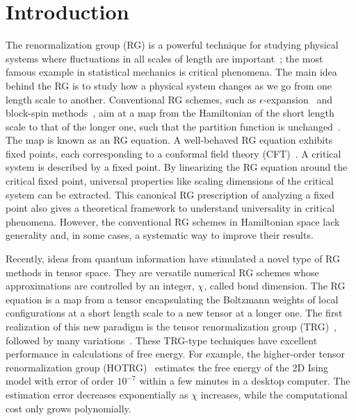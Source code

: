\documentclass[aps,prr,reprint,superscriptaddress,floatfix]{revtex4-2}
\begin{document}
\maketitle

\section{Introduction\label{intro}}
The renormalization group (RG) is a powerful technique for studying physical systems where fluctuations in all scales of length are important~\cite{wilsonNobel}; the most famous example in statistical mechanics is critical phenomena.
The main idea behind the RG is to study how a physical system changes as we go from one length scale to another.
Conventional RG schemes, such as $\epsilon$-expansion~\cite{wilson1972} and block-spin methods~\cite{kadanoff1966,kadanoff1975,migdal,kadanoff1976,niemeijer1973}, aim at a map from the Hamiltonian of the short length scale to that of the longer one, such that the partition function is unchanged~\cite{nonlinearRG}.
The map is known as an RG equation. 
A well-behaved RG equation exhibits fixed points, each corresponding to a conformal field theory (CFT)~\cite{polchinski1988,nakayama2015}.
A critical system is described by a fixed point.
By linearizing the RG equation around the critical fixed point, universal properties like scaling dimensions of the critical system can be extracted.
This canonical RG prescription of analyzing a fixed point also gives a theoretical framework to understand universality in critical phenomena.
However, the conventional RG schemes in Hamiltonian space lack generality and, in some cases, a systematic way to improve their results.
%

Recently, ideas from quantum information have stimulated a novel type of RG methods in tensor space.
They are versatile numerical RG schemes whose approximations are controlled by an integer, $\chi$, called bond dimension.
The RG equation is a map from a tensor encapsulating the Boltzmann weights of local configurations at a short length scale to a new tensor at a longer one.
The first realization of this new paradigm is the tensor renormalization group (TRG)~\cite{trg}, followed by many variations~\cite{SRGa,SRGb,hotrg,atrg, triadtrg,morita2020global}.
These TRG-type techniques have excellent performance in calculations of free energy. 
For example, the higher-order tensor renormalization group (HOTRG)~\cite{hotrg} estimates the free energy of the 2D Ising model with error of order $10^{-7}$ within a few minutes in a desktop computer.
The estimation error decreases exponentially as $\chi$ increases, while the computational cost only grows polynomially.
%
\end{document}

